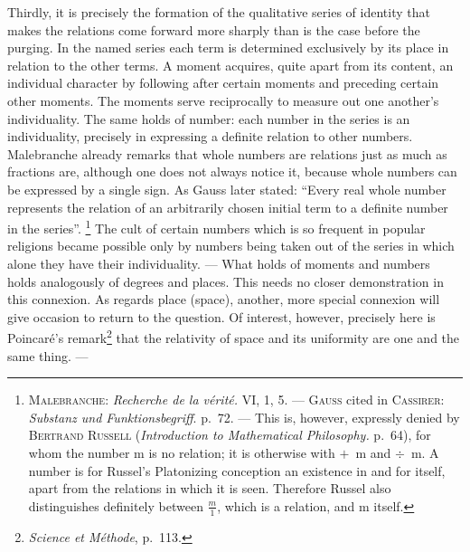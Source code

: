 \documentclass[12pt]{article}
\newcommand{\opage}[1]{\marginnote{\footnotesize\textit{[#1]}}}
\begin{document}
Thirdly, it is precisely the formation of the qualitative series of identity
that makes the relations come forward more sharply than is the case before
the purging. In the named series each term is determined exclusively by its
place in relation to the other terms. A moment acquires, quite apart from
its content, an individual character by following after certain moments and
preceding certain other moments. The moments serve reciprocally to measure
out one another's individuality. The same holds of number: each number in
the series is an individuality, precisely in expressing a definite relation
to other numbers. Malebranche already remarks that whole numbers are
relations just as much as fractions are, although one does not always notice
it, because whole numbers can be expressed by a single sign. As Gauss later
stated: ``Every real whole number represents the relation of an arbitrarily
chosen initial term to a definite number in the
series''.%
\footnote{\textsc{Malebranche}: \textit{Recherche de la vérité.} VI, 1, 5.
--- \textsc{Gauss} cited in \textsc{Cassirer}: \textit{Substanz und
Funktionsbegriff}. p.~72. --- This is, however, expressly denied by
\textsc{Bertrand Russell} (\textit{Introduction to Mathematical
Philosophy.} p.~64), for whom the number m is no relation; it is otherwise
with $+$~m and $\div$~m. A number is for Russel's Platonizing conception an
existence in and for itself, apart from the relations in which it is seen.
Therefore Russel also distinguishes definitely between $\frac{m}{1}$, which
is a relation, and m itself.}
The cult of certain numbers which is so frequent in popular religions became
possible only by numbers being taken out of the series in which alone they
have their individuality. --- What holds of moments and numbers holds
analogously of degrees and places. This needs no closer demonstration in
this connexion. As regards place (space), another, more special connexion
will give occasion to \opage{44}return to the question. Of interest, however,
precisely here is Poincaré's remark\footnote{\textit{Science et Méthode},
p.~113.} that the relativity of space and its uniformity are one and the
same thing. ---
\end{document}
